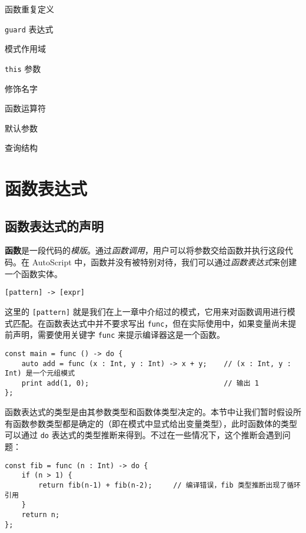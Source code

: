 \begin{introduction}
    \item 函数重复定义
    \item \lstinline!guard! 表达式
    \item 模式作用域
    \item \lstinline!this! 参数
    \item 修饰名字
    \item 函数运算符
    \item 默认参数
    \item 查询结构
\end{introduction}


\section{函数表达式}

\subsection{函数表达式的声明}

\textbf{函数}是一段代码的\emph{模版}。通过\emph{函数调用}，用户可以将参数交给函数并执行这段代码。在 AutoScript 中，函数并没有被特别对待，我们可以通过\emph{函数表达式}来创建一个函数实体。

\begin{grammar} \label{grm:function-expression}
    \lstinline![pattern] -> [expr]!
\end{grammar}

这里的 \lstinline![pattern]! 就是我们在上一章中介绍过的模式，它用来对函数调用进行模式匹配。在函数表达式中并不要求写出 \lstinline!func!，但在实际使用中，如果变量尚未提前声明，需要使用关键字 \lstinline!func! 来提示编译器这是一个函数。

\begin{lstlisting}
const main = func () -> do {
    auto add = func (x : Int, y : Int) -> x + y;    // (x : Int, y : Int) 是一个元组模式
    print add(1, 0);                                // 输出 1
};
\end{lstlisting}

函数表达式的类型是由其参数类型和函数体类型决定的。本节中让我们暂时假设所有函数参数类型都是确定的（即在模式中显式给出变量类型），此时函数体的类型可以通过 \lstinline!do! 表达式的类型推断来得到。不过在一些情况下，这个推断会遇到问题：

\begin{lstlisting}
const fib = func (n : Int) -> do {
    if (n > 1) {
        return fib(n-1) + fib(n-2);     // 编译错误，fib 类型推断出现了循环引用
    }
    return n;
};
\end{lstlisting}


